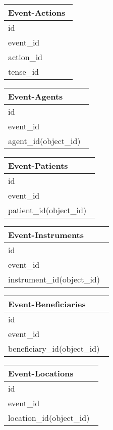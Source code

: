 \documentclass[10pt]{article}
\begin{document}
\begin{multicols}{2}
\begin{tabular}{|p{0.95\linewidth}|} 
\hline                   
\textbf{Event-Actions}
\\
\hline
id\\
\hline
event\_id\\
\hline
action\_id\\
\hline
tense\_id\\
\hline
\end{tabular}




\begin{tabular}{|p{0.95\linewidth}|} 
\hline                   
\textbf{Event-Agents}
\\
\hline
id\\
\hline
event\_id\\
\hline
agent\_id(object\_id)\\
\hline
\end{tabular}
\label{table:nonlin}




\begin{tabular}{|p{0.95\linewidth}|} 
\hline                   
\textbf{Event-Patients}
\\
\hline
id\\
\hline
event\_id\\
\hline
patient\_id(object\_id)\\
\hline
\end{tabular}




\begin{tabular}{|p{0.95\linewidth}|} 
\hline                   
\textbf{Event-Instruments}
\\
\hline
id\\
\hline
event\_id\\
\hline
instrument\_id(object\_id)\\
\hline
\end{tabular}



\begin{tabular}{|p{0.95\linewidth}|} 
\hline                   
\textbf{Event-Beneficiaries}
\\
\hline
id\\
\hline
event\_id\\
\hline
beneficiary\_id(object\_id)\\
\hline
\end{tabular}


\begin{tabular}{|p{0.95\linewidth}|} 
\hline                   
\textbf{Event-Locations}
\\
\hline
id\\
\hline
event\_id\\
\hline
location\_id(object\_id)\\
\hline
\end{tabular}




\end{multicols}
\end{document}
